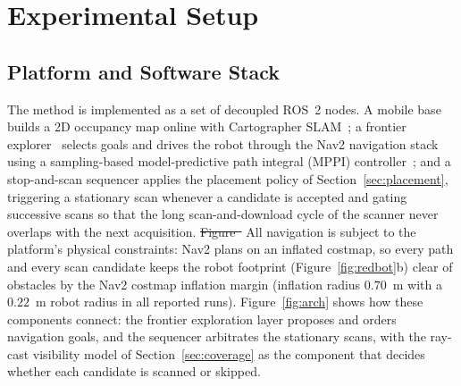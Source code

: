 \documentclass[sensors,article,submit,pdftex,moreauthors]{Definitions/mdpi}
\providecommand{\DIFadd}[1]{{\protect\color{blue} \sf #1}} %
\providecommand{\DIFdel}[1]{{\protect\color{red}\protect\scriptsize\protect\sout{#1}}} %
\providecommand{\DIFaddbegin}{} %
\providecommand{\DIFaddend}{} %
\providecommand{\DIFdelbegin}{} %
\providecommand{\DIFdelend}{} %
\begin{document}
\section{Experimental Setup}
\label{sec:setup}

\subsection{Platform and Software Stack}

The method is implemented as a set of decoupled ROS~2 nodes. A mobile base
builds a 2D occupancy map online with Cartographer SLAM~\cite{hess2016}; a
frontier explorer~\cite{guler2024} selects goals and drives the robot through
the Nav2 navigation stack~\cite{macenski2020} using a sampling-based
model-predictive path integral (MPPI) controller~\cite{williams2016}; and a
stop-and-scan sequencer applies the
placement policy of Section~\ref{sec:placement}, triggering a stationary scan
whenever a candidate is accepted and gating successive scans so that the long
scan-and-download cycle of the scanner never overlaps with the next acquisition.
\DIFdelbegin \DIFdel{Figure~}\DIFdelend \DIFaddbegin \DIFadd{All navigation is subject to the platform's physical constraints: Nav2 plans on
an inflated costmap, so every path and every scan candidate keeps the robot
footprint (Figure~\ref{fig:redbot}b) clear of obstacles by the Nav2 costmap
inflation margin (inflation radius $0.70$~m with a $0.22$~m robot radius in
all reported runs).
Figure~}\DIFaddend \ref{fig:arch} shows how these components connect: the frontier
exploration layer proposes and orders navigation goals, and the sequencer
arbitrates the stationary scans, with the ray-cast visibility model of
Section~\ref{sec:coverage} as the component that decides whether each candidate
is scanned or skipped.
\end{document}
